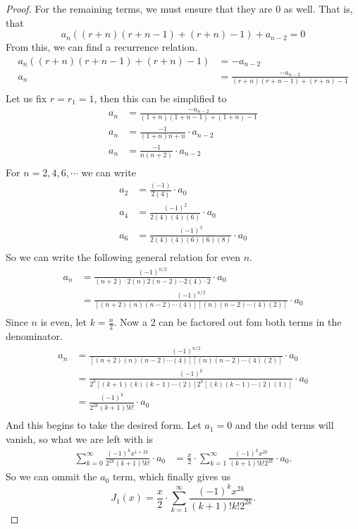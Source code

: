 \documentclass{article}
\theoremstyle{definition}
\begin{document}
    \begin{proof}
       For the remaining terms, we must ensure that they are 0 as well.
       That is, that
       \[
           a_n((r+n)(r+n-1)+(r+n)-1) + a_{n-2} = 0
       \] 
       From this, we can find a recurrence relation.
       \begin{align*}
           a_n((r+n)(r+n-1)+(r+n)-1) &= -a_{n-2} \\
           a_n &= \frac{-a_{n-2}}{(r+n)(r+n-1) + (r+n) - 1} \\
       \end{align*}
       Let us fix $r = r_1 = 1$, then this can be simplified to
       \begin{align*}
           a_n &= \frac{-a_{n-2}}{(1+n)(1+n-1) + (1+n) - 1} \\
            a_n &= \frac{-1}{(1+n)n + n} \cdot a_{n-2} \\
            a_n &= \frac{-1}{n(n + 2)} \cdot a_{n-2} \\
       \end{align*}
       For $n = 2,4,6,\cdots$ we can write
       \begin{align*}
           a_2 &= \frac{(-1)}{2(4)}\cdot a_0 \\
           a_4 &= \frac{(-1)^2}{2(4)(4)(6)}\cdot a_0 \\
           a_6 &= \frac{(-1)^3}{2(4)(4)(6)(6)(8)}\cdot a_0 \\
       \end{align*}
       So we can write the following general relation for even $n$.
       \begin{align*}
           a_n &= \frac{(-1)^{n / 2}}{(n+2) \cdot 2(n)2(n-2) \cdots 2(4) \cdot 2} \cdot a_0 \\
           &= \frac{(-1)^{n / 2}}{[(n+2)(n)(n-2)\cdots(4)][(n)(n-2)\cdots(4)(2)]} \cdot a_0  \\
       \end{align*}
       Since $n$ is even, let $k = \frac{n}{2}$. Now a 2 can be factored out fom both terms in the denominator.
       \begin{align*}
           a_n &= \frac{(-1)^{n / 2}}{[(n+2)(n)(n-2)\cdots(4)][(n)(n-2)\cdots(4)(2)]} \cdot a_0 \\
          &=  \frac{(-1)^k}{2^k[(k+1)(k)(k-1)\cdots(2)]2^k[(k)(k-1)\cdots(2)(1)]}\cdot a_0\\ 
          &= \frac{(-1)^k}{2^{2k}(k+1)!k!}\cdot a_0 \\
       \end{align*}
       And this begins to take the desired form.
       Let $a_1=0$ and the odd terms will vanish, so what we are left with is 
       \begin{align*}
       \sum_{k=0}^{\infty} \frac{(-1)^k x^{1+2k}}{2^{2k}(k+1)!k!}\cdot a_0
       &= \frac{x}{2}\cdot \sum_{k=1}^{\infty} \frac{(-1)^k x^{2k}}{(k+1)!k! 2^{2k}} \cdot a_0 
       .\end{align*}
       So we can ommit the $a_0$ term, which finally gives us 
       \[
       J_1(x) = \frac{x}{2}\cdot \sum_{k=1}^{\infty} \frac{(-1)^k x^{2k}}{(k+1)!k! 2^{2k}} 
       .\] 
    \end{proof}
\end{document}
